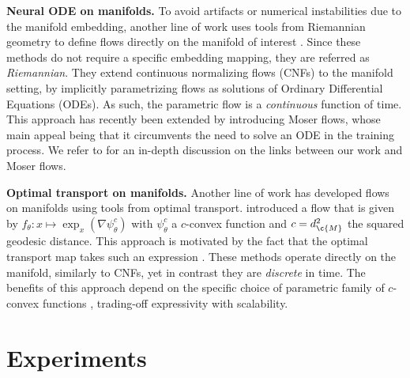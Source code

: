 \textbf{Neural ODE on manifolds.}
To avoid artifacts or numerical instabilities due to the manifold embedding, another line of work uses tools from Riemannian geometry to define flows directly on the manifold of interest \parencite{falorsi2020neural,mathieu2020riemannian,falorsi2021Continuous}.
Since these methods do not require a specific embedding mapping, they are referred as \emph{Riemannian}.
They extend continuous normalizing flows (CNFs) \parencite{grathwohl2019scalable} to the manifold setting, by implicitly parametrizing flows as solutions of Ordinary Differential Equations (ODEs).
As such, the parametric flow is a \emph{continuous} function of time.
This approach has recently been extended by \textcite{rozen2021moser} introducing Moser flows, whose main appeal being that it circumvents the need to solve an ODE in the training process.
We refer to  for an in-depth discussion on the links between our work and Moser flows.

\textbf{Optimal transport on manifolds.}
Another line of work has developed flows on manifolds using tools from optimal transport.
\cite{sei2013jacobian} introduced a flow that is given by $f_\theta: x \mapsto \exp_x(\nabla \psi^c_\theta)$
with $\psi^c_\theta$ a $c$-convex function and $c=d^2_{\c{M}}$ the squared
geodesic distance.
This approach is motivated by the fact that the optimal transport map takes such an expression \parencite{ambrosio2003Optimal}.
These methods operate directly on the manifold, similarly to CNFs, yet in contrast they are \emph{discrete} in time.
The benefits of this approach depend on the specific choice of parametric family of $c$-convex functions \parencite{rezende2021implicit,cohen2021riemannian}, trading-off expressivity with scalability.

\section{Experiments}

